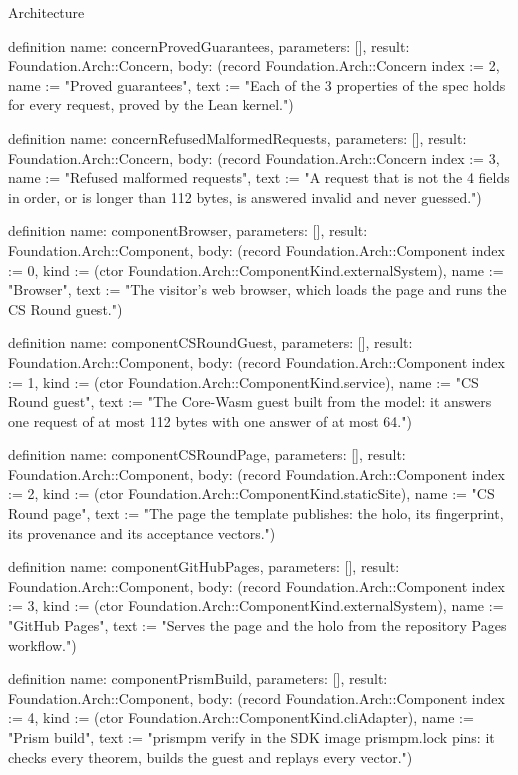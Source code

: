 \begin{lexlean}{Architecture}
\begin{semanticmodule}
definition{
  name: concernProvedGuarantees,
  parameters: [],
  result: Foundation.Arch::Concern,
  body: (record Foundation.Arch::Concern {index := 2, name := "Proved guarantees", text := "Each of the 3 properties of the spec holds for every request, proved by the Lean kernel."})
}

definition{
  name: concernRefusedMalformedRequests,
  parameters: [],
  result: Foundation.Arch::Concern,
  body: (record Foundation.Arch::Concern {index := 3, name := "Refused malformed requests", text := "A request that is not the 4 fields in order, or is longer than 112 bytes, is answered invalid and never guessed."})
}

definition{
  name: componentBrowser,
  parameters: [],
  result: Foundation.Arch::Component,
  body: (record Foundation.Arch::Component {index := 0, kind := (ctor Foundation.Arch::ComponentKind.externalSystem), name := "Browser", text := "The visitor's web browser, which loads the page and runs the CS Round guest."})
}

definition{
  name: componentCSRoundGuest,
  parameters: [],
  result: Foundation.Arch::Component,
  body: (record Foundation.Arch::Component {index := 1, kind := (ctor Foundation.Arch::ComponentKind.service), name := "CS Round guest", text := "The Core-Wasm guest built from the model: it answers one request of at most 112 bytes with one answer of at most 64."})
}

definition{
  name: componentCSRoundPage,
  parameters: [],
  result: Foundation.Arch::Component,
  body: (record Foundation.Arch::Component {index := 2, kind := (ctor Foundation.Arch::ComponentKind.staticSite), name := "CS Round page", text := "The page the template publishes: the holo, its fingerprint, its provenance and its acceptance vectors."})
}

definition{
  name: componentGitHubPages,
  parameters: [],
  result: Foundation.Arch::Component,
  body: (record Foundation.Arch::Component {index := 3, kind := (ctor Foundation.Arch::ComponentKind.externalSystem), name := "GitHub Pages", text := "Serves the page and the holo from the repository Pages workflow."})
}

definition{
  name: componentPrismBuild,
  parameters: [],
  result: Foundation.Arch::Component,
  body: (record Foundation.Arch::Component {index := 4, kind := (ctor Foundation.Arch::ComponentKind.cliAdapter), name := "Prism build", text := "prismpm verify in the SDK image prismpm.lock pins: it checks every theorem, builds the guest and replays every vector."})
}


\end{semanticmodule}
\end{lexlean}
